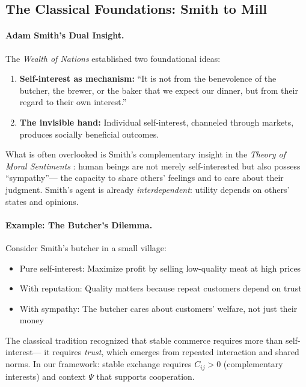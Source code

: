 \subsection{The Classical Foundations: Smith to Mill}

\paragraph{Adam Smith's Dual Insight.}
The \emph{Wealth of Nations} \citep{smith1776} established two foundational ideas:
\begin{enumerate}
  \item \textbf{Self-interest as mechanism:} ``It is not from the benevolence of the butcher, 
        the brewer, or the baker that we expect our dinner, but from their regard to their own interest.''
  \item \textbf{The invisible hand:} Individual self-interest, channeled through markets,
        produces socially beneficial outcomes.
\end{enumerate}

What is often overlooked is Smith's complementary insight in the \emph{Theory of Moral Sentiments} \citep{smith1759}:
human beings are not merely self-interested but also possess ``sympathy''---
the capacity to share others' feelings and to care about their judgment.
Smith's agent is already \emph{interdependent}: utility depends on others' states and opinions.

\paragraph{Example: The Butcher's Dilemma.}
Consider Smith's butcher in a small village:
\begin{itemize}
  \item Pure self-interest: Maximize profit by selling low-quality meat at high prices
  \item With reputation: Quality matters because repeat customers depend on trust
  \item With sympathy: The butcher cares about customers' welfare, not just their money
\end{itemize}

The classical tradition recognized that stable commerce requires more than self-interest---
it requires \emph{trust}, which emerges from repeated interaction and shared norms.
In our framework: stable exchange requires $C_{ij} > 0$ (complementary interests)
and context $\Psi$ that supports cooperation.

